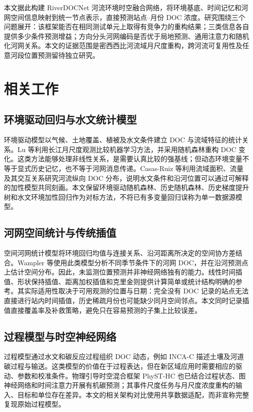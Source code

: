 \documentclass[UTF8,11pt,a4paper,fontset=none]{ctexart}
\begin{document}
本文据此构建 RiverDOCNet 河流环境时空融合网络，将环境基底、时间记忆和河网空间信息映射到统一节点表示，直接预测站点--月份 DOC 浓度。研究围绕三个问题展开：该框架能否在相同测试单元上取得有竞争力的重构结果；三类信息各自提供多少条件预测增益；方向分头河网编码是否优于局地预测、通用注意力和随机化河网关系。本文的证据范围是密西西比河流域月尺度重构，跨河流可复用性及任意河段位置预测留待独立研究。


\section{相关工作}

\subsection{环境驱动回归与水文统计模型}

环境驱动模型以气候、土地覆盖、植被及水文条件建立 DOC 与流域特征的统计关系。Lu 等利用长江月尺度观测比较机器学习方法，并采用随机森林重构 DOC 变化\cite{lu2026}。这类方法能够处理非线性关系，是需要认真比较的强基线；但动态环境变量不等于显式历史记忆，也不等于河网消息传递。Casas-Ruiz 等利用流域面积、流量及其交互关系研究河流纵向 DOC 分布\cite{casas2020}，说明水文条件和沿河位置可以通过可解释的加性模型共同刻画。本文保留环境驱动随机森林、历史随机森林、历史梯度提升树和水文环境加性回归作为对标方法，不将已有多变量回归误称为单一数据源模型。


\subsection{河网空间统计与传统插值}

空间河网统计模型将环境回归均值与连接关系、沿河距离所决定的空间协方差结合。Wampler 等使用此类模型分析不同季节条件下的河网 DOC，并在沿河预测点上估计空间分布\cite{wampler2024}。因此，未监测位置预测并非神经网络独有的能力。线性时间插值、形状保持插值、距离加权插值和克里金则提供计算简单或统计结构明确的参考。其实际适用性取决于可用观测的位置与日期：完全没有 DOC 记录的站点无法直接进行站内时间插值，历史稀疏月份也可能缺少同月空间邻点。本文同时记录插值直接覆盖率及补救策略，避免只在容易预测的子集上比较误差。


\subsection{过程模型与时空神经网络}

过程模型通过水文和碳反应过程组织 DOC 动态，例如 INCA-C 描述土壤及河道碳过程与输送\cite{futter2007}。这类模型的价值在于过程表达，但在新区域应用时需要相应的驱动、参数和校准条件。物理引导时空混合框架 PhyST-HC 也已结合过程状态、图神经网络和时间注意力开展有机碳预测\cite{budamala2026}；其事件尺度任务与月尺度浓度重构的输入、目标和单位存在差异。本文的相关架构对比使用共享数据适配，而非宣称完整复现原始过程模型。
\end{document}
